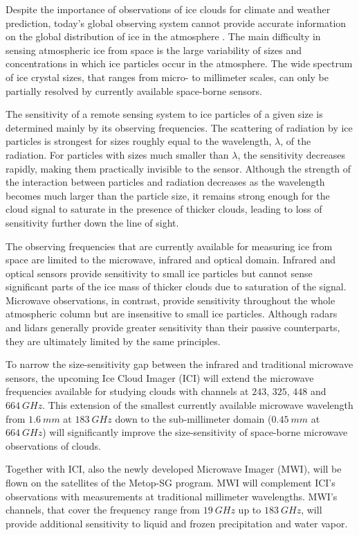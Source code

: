 \documentclass[journal abbreviation, manuscript]{copernicus}
\begin{document}
Despite the importance of observations of ice clouds for climate and weather
prediction, today's global observing system cannot provide accurate information
on the global distribution of ice in the atmosphere
\citep{eliasson11,duncan18a}. The main difficulty in sensing atmospheric ice
from space is the large variability of sizes and concentrations in which ice
particles occur in the atmosphere. The wide spectrum of ice crystal sizes, that
ranges from micro- to millimeter scales, can only be partially resolved by
currently available space-borne sensors.

The sensitivity of a remote sensing system to ice particles of a given size is
determined mainly by its observing frequencies. The scattering of radiation by
ice particles is strongest for sizes roughly equal to the wavelength, $\lambda$,
of the radiation. For particles with sizes much smaller than $\lambda$, the
sensitivity decreases rapidly, making them practically invisible to the sensor.
Although the strength of the interaction between particles and radiation
decreases as the wavelength becomes much larger than the particle size, it
remains strong enough for the cloud signal to saturate in the presence of
thicker clouds, leading to loss of sensitivity further down the line of sight.

The observing frequencies that are currently available for measuring ice from
space are limited to the microwave, infrared and optical domain. Infrared and
optical sensors provide sensitivity to small ice particles but cannot sense
significant parts of the ice mass of thicker clouds due to saturation of the
signal. Microwave observations, in contrast, provide sensitivity throughout the
whole atmospheric column but are insensitive to small ice particles. Although
radars and lidars generally provide greater sensitivity than their passive
counterparts, they are ultimately limited by the same principles.

To narrow the size-sensitivity gap between the infrared and traditional microwave
sensors, the upcoming Ice Cloud Imager (ICI) will extend the microwave
frequencies available for studying clouds with channels at $243$, $325$, $448$ and
$664\ \unit{GHz}$. This extension of the smallest currently available microwave
wavelength from $1.6\ \unit{mm}$ at $183\ \unit{GHz}$ down to the sub-millimeter
domain ($0.45\ \unit{mm}$ at $664\ \unit{GHz}$) will significantly improve the
size-sensitivity of space-borne microwave observations of clouds.

Together with ICI, also the newly developed Microwave Imager (MWI), will be
flown on the satellites of the Metop-SG program. MWI will complement ICI's
observations with measurements at traditional millimeter wavelengths. MWI's
channels, that cover the frequency range from $19\ \unit{GHz}$ up to
$183\ \unit{GHz}$, will provide additional sensitivity to liquid and frozen
precipitation and water vapor.
\end{document}
